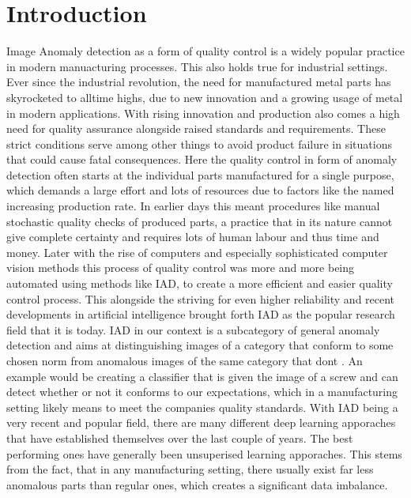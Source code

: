 \chapter{Introduction}
\label{chap:introduction}

Image Anomaly detection as a form of quality control is a widely popular practice in modern manuacturing processes. This also holds true for 
industrial settings. Ever since the industrial revolution, the need for manufactured metal parts has skyrocketed to alltime highs, due to new innovation and a growing usage of metal in modern applications. 
With rising innovation and production also comes a high need for quality 
assurance alongside raised standards and requirements. These strict conditions serve among other things 
to avoid product failure in situations that could cause fatal consequences. Here the quality control in form of anomaly detection often 
starts at the individual parts manufactured for a single purpose, which demands a large effort and lots of resources due to factors like 
the named increasing production rate. 
In earlier days this meant procedures like manual stochastic quality checks of produced parts, a practice that in its nature cannot give 
complete certainty and requires lots of human labour and thus time and money. Later with the rise of computers and especially sophisticated computer vision methods 
this process of quality control was more and more being automated using methods like IAD, to create 
a more efficient and easier quality control process. This 
alongside the striving for even higher reliability and recent developments in artificial intelligence 
brought forth IAD as the popular research field that it is today. IAD in our context is a subcategory of general anomaly detection 
and aims at distinguishing images of a category that conform to some chosen norm from anomalous images of the same category that dont . 
An example would be creating a classifier that is given the image of a screw and can detect whether or not it conforms to our expectations, 
which in a manufacturing setting likely means to meet the companies quality standards.
\newline
With IAD being a very recent and popular field, there are many different deep learning apporaches that have established themselves over 
the last couple of years. The best performing ones have generally been unsuperised learning apporaches. This stems from the fact, that 
in any manufacturing setting, there usually exist far less anomalous parts than regular ones, which creates a significant data imbalance. 
